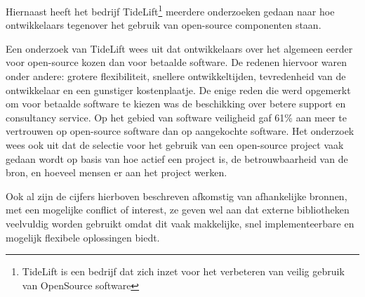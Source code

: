 Hiernaast heeft het bedrijf TideLift\footnote{TideLift is een bedrijf dat zich inzet voor het verbeteren van veilig gebruik van OpenSource software} meerdere onderzoeken gedaan naar hoe ontwikkelaars tegenover het gebruik van open-source componenten staan.

Een onderzoek van TideLift wees uit dat ontwikkelaars over het algemeen eerder voor open-source kozen dan voor betaalde software. De redenen hiervoor waren onder andere: grotere flexibiliteit, snellere ontwikkeltijden, tevredenheid van de ontwikkelaar en een gunstiger kostenplaatje\citep{TideLift:2021}. De enige reden die werd opgemerkt om voor betaalde software te kiezen was de beschikking over betere support en consultancy service. Op het gebied van software veiligheid gaf 61\% aan meer te vertrouwen op open-source software dan op aangekochte software.
Het onderzoek wees ook uit dat de selectie voor het gebruik van een open-source project vaak gedaan wordt op basis van hoe actief een project is, de betrouwbaarheid van de bron, en hoeveel mensen er aan het project werken.

Ook al zijn de cijfers hierboven beschreven afkomstig van afhankelijke bronnen, met een mogelijke conflict of interest, ze geven wel aan dat externe bibliotheken veelvuldig worden gebruikt omdat dit vaak makkelijke, snel implementeerbare en mogelijk flexibele oplossingen biedt.

